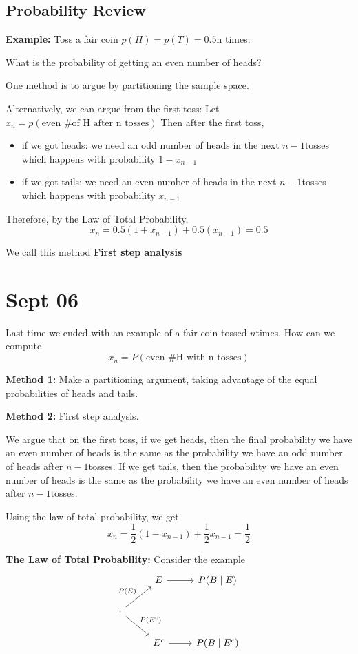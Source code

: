 \documentclass[12pt]{article}
\begin{document}
\subsection*{Probability Review}
    \textbf{Example:} Toss a fair coin $p(H) = p(T) = 0.5$n times. 

    What is the probability of getting an even number of heads? 

    One method is to argue by partitioning the sample space. 

    Alternatively, we can argue from the first toss: Let $x_n = p(\text{even \# of H after n tosses})$ Then after the first toss, 
    \begin{itemize}
        \item if we got heads: we need an odd number of heads in the next $n-1$tosses which happens with probability $1 - x_{n-1}$
        \item if we got tails: we need an even number of heads in the next $n-1$tosses which happens with probability $x_{n-1}$
    \end{itemize}

    Therefore, by the Law of Total Probability, 
    \[x_n = 0.5(1 + x_{n-1}) + 0.5(x_{n-1}) = 0.5\]
    
    We call this method \textbf{First step analysis}

\section{Sept 06}
    Last time we ended with an example of a fair coin tossed $n$times. How can we compute 
    \[x_n = P(\text{even \# H with n tosses})\]

    \textbf{Method 1:} Make a partitioning argument, taking advantage of the equal probabilities of heads and tails.

    \textbf{Method 2:} First step analysis.
    
    We argue that on the first toss, if we get heads, then the final probability we have an even number of heads is the same as the probability we have an odd number of heads after $n-1$tosses. If we get tails, then the probability we have an even number of heads is the same as the probability we have an even number of heads after $n-1$tosses.

    Using the law of total probability, we get
    \[x_n = \frac{1}{2}(1 - x_{n-1}) + \frac{1}{2}x_{n-1} = \frac{1}{2}\]

    \textbf{The Law of Total Probability:} 
    Consider the example 
    \[\begin{tikzcd}
        & E \arrow[r] &  P(B \; | \; E)\\
        \cdot \arrow[ur, "P(E)"] \arrow[dr, "P(E^c)"] \\
        & E^c \arrow[r] & P(B \; | \; E^c)
    \end{tikzcd}\]
\end{document}
